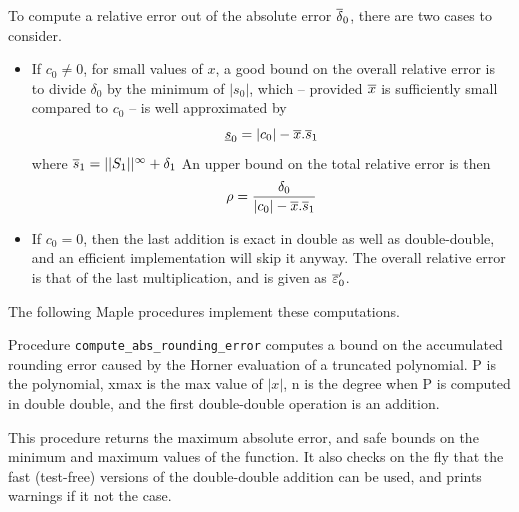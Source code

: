   To compute a  relative error out of the absolute error
  ${\overline{\delta}}_0$, there are two cases to consider.
\begin{itemize}
\item If $c_0\ne 0$, for small values of $x$, a good bound on the
  overall relative error is to divide $\delta_0$ by the minimum of
  $|s_0|$, which -- provided ${\overline{x}}$ is sufficiently small compared to
  $c_0$ -- is well approximated by
  $$\underline{s}_{0}=|c_0| - {\overline{x}} . \overline{s}_{1}$$ 
  where $\overline{s}_{1}=||{S_1}||^{\infty} + \delta_1$
  An upper bound on the total
  relative error is then
  $$\rho = \frac{\delta_0}{|c_0| - {\overline{x}} . \overline{s}_{1}}$$
  
\item If $c_0=0$, then the last addition is exact in double as well as
  double-double, and an efficient implementation will skip it anyway.
  The overall relative error is that of the last multiplication, and is given as ${\overline{\varepsilon}}'_0$.
\end{itemize}


The following  Maple procedures implement these computations.

Procedure \texttt{compute\_abs\_rounding\_error} computes a bound on
the accumulated rounding error caused by the Horner evaluation of a
truncated polynomial. P is the polynomial,  xmax is the max
value of $|x|$,  n is the degree when P is computed in double double, and the first double-double operation is an addition.

This procedure returns the maximum absolute error, and safe bounds on the
minimum and maximum values of the function. It also checks on the fly
that the fast (test-free) versions of the double-double addition can
be used, and prints warnings if it not the case.

